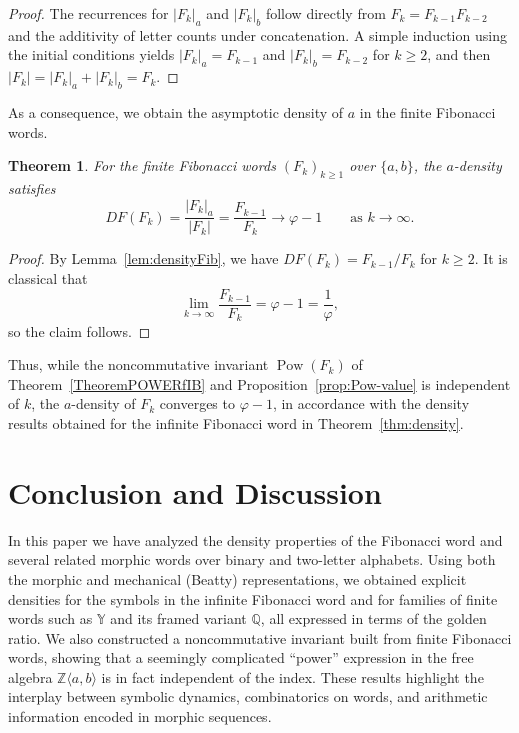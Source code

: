 \documentclass[12pt, a4paper]{article}
\newtheorem{theorem}{Theorem}[section]
\begin{document}
\begin{proof}
The recurrences for $|F_k|_a$ and $|F_k|_b$ follow directly from $F_k = F_{k-1}F_{k-2}$ and the additivity of letter counts under concatenation. A simple induction using the initial conditions yields $|F_k|_a = F_{k-1}$ and $|F_k|_b = F_{k-2}$ for $k \ge 2$, and then $|F_k| = |F_k|_a + |F_k|_b = F_k$.
\end{proof}

As a consequence, we obtain the asymptotic density of $a$ in the finite Fibonacci words.

\begin{theorem}\label{TheoremPOWERfIBn1}
For the finite Fibonacci words $(F_k)_{k \ge 1}$ over $\{a,b\}$, the $a$-density satisfies
\[
DF(F_k) = \frac{|F_k|_a}{|F_k|}
= \frac{F_{k-1}}{F_k} \longrightarrow \varphi - 1
\qquad \text{as } k \to \infty.
\]
\end{theorem}

\begin{proof}
By Lemma~\ref{lem:densityFib}, we have $DF(F_k) = F_{k-1}/F_k$ for $k \ge 2$. It is classical that
\[
\lim_{k \to \infty} \frac{F_{k-1}}{F_k} = \varphi - 1 = \frac{1}{\varphi},
\]
so the claim follows.
\end{proof}

Thus, while the noncommutative invariant $\operatorname{Pow}(F_k)$ of Theorem~\ref{TheoremPOWERfIB} and Proposition~\ref{prop:Pow-value} is independent of $k$, the $a$-density of $F_k$ converges to $\varphi - 1$, in accordance with the density results obtained for the infinite Fibonacci word in Theorem~\ref{thm:density}.
\section{Conclusion and Discussion}\label{sec5}

In this paper we have analyzed the density properties of the Fibonacci word and several related morphic words over binary and two-letter alphabets. Using both the morphic and mechanical (Beatty) representations, we obtained explicit densities for the symbols in the infinite Fibonacci word and for families of finite words such as $\mathbb{Y}$ and its framed variant $\mathbb{Q}$, all expressed in terms of the golden ratio. We also constructed a noncommutative invariant built from finite Fibonacci words, showing that a seemingly complicated ``power'' expression in the free algebra $\mathbb{Z}\langle a,b\rangle$ is in fact independent of the index. These results highlight the interplay between symbolic dynamics, combinatorics on words, and arithmetic information encoded in morphic sequences.
\end{document}
